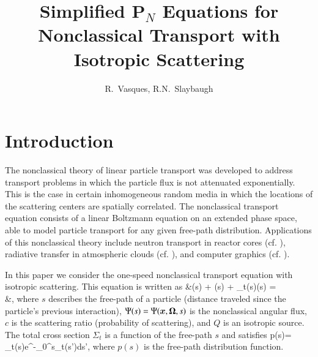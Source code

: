 \documentclass{anstrans}
\title{Simplified P$_N$ Equations for Nonclassical Transport with Isotropic Scattering}
\author{R.~Vasques, R.N.~Slaybaugh}
\institute{
Department of Nuclear Engineering, University of California, Berkeley, Berkeley, CA 94720-1730
}
\def\bal#1\nal{\begin{align}#1\end{align}}
\newcommand{\f}{\frac}
\newcommand{\ux}{{\bm x}}
\newcommand{\unab}{{\bf \nabla}}
\newcommand{\uom}{{\bf \Omega}}
\begin{document}
\vspace*{-42pt}
\begin{strip}
\vspace*{14pt}
\end{strip}


\section{Introduction}
The nonclassical theory of linear particle transport \cite{lar07,larvas11} was developed to address transport problems in which the particle flux is not attenuated exponentially.
This is the case in certain inhomogeneous random media in which the locations of the
scattering centers are spatially correlated.
The nonclassical transport equation consists of a linear Boltzmann equation on
an extended phase space, able to model particle transport for any given free-path
distribution.
Applications of this nonclassical theory include neutron transport in reactor cores (cf. \cite{vaslar14b}), radiative transfer in atmospheric clouds (cf. \cite{davxu14}), and computer graphics (cf. \cite{deon13}).

In this paper we consider the one-speed nonclassical transport equation with isotropic scattering.
This equation is written as
\bal\label{1}
&\f{\partial \Psi}{\partial s}(s) + \uom\cdot\unab\Psi(s) + \Sigma_t(s)\Psi(s) =\\
&\qquad \f{\delta(s)}{4\pi}\left[\int_{4\pi}\int_0^\infty c\Sigma_t(s')\Psi(\ux,\uom',s')ds'd\Omega' + Q(\ux)\right],\nonumber
\nal
where $s$ describes the free-path of a particle (distance traveled since the particle's previous interaction), $\Psi(s)=\Psi(\ux,\uom,s)$ is the nonclassical angular flux, $c$ is the scattering ratio (probability of scattering), and $Q$ is an isotropic source.
The total cross section $\Sigma_t$ is a function of the free-path $s$ and satisfies \bal\label{2}
p(s)= \Sigma_t(s)e^{-\int_0^s\Sigma_t(s')ds'},
\nal
where $p(s)$ is the free-path distribution function.
\end{document}
